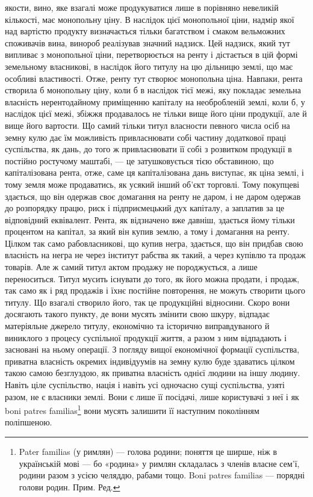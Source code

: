 \parcont{}  %
якости, вино, яке взагалі може продукуватися лише в порівняно невеликій кількості,
має монопольну ціну. В наслідок цієї монопольної ціни, надмір якої над вартістю
продукту визначається тільки багатством і смаком вельможних споживачів вина,
винороб реалізував значний надзиск. Цей надзиск, який тут випливає з монопольної
ціни, перетворюється на ренту і дістається в цій формі земельному власникові, в
наслідок його титулу на цю дільницю землі, що має особливі властивості. Отже,
ренту тут створює монопольна ціна. Навпаки, рента створила б монопольну ціну,
коли б в наслідок тієї межі, яку покладає земельна власність нерентодайному приміщенню
капіталу на необробленій землі, коли б, у наслідок цієї межі, збіжжя продавалось
не тільки вище його ціни продукції, але й вище його вартости. Що самий
тільки титул власности певного числа осіб на земну кулю дає їм можливість привласнювати
собі частину додаткової праці суспільства, як дань, до того ж привласнювати
її собі з розвитком продукції в постійно ростучому маштабі, — це затушковується
тією обставиною, що капіталізована рента, отже, саме ця капіталізована
дань виступає, як ціна землі, і тому земля може продаватись, як усякий інший
об’єкт торговлі. Тому покупцеві здається, що він одержав своє домагання на ренту
не даром, і не даром одержав до розпорядку працю, риск і підприємецький дух
капіталу, а заплатив за це відповідний еквівалент. Рента, як відзначено вже
давніш, здається йому тільки процентом на капітал, за який він купив землю,
а тому і домагання на ренту. Цілком так само рабовласникові, що купив негра,
здається, що він придбав свою власність на негра не через інститут рабства
як такий, а через купівлю та продаж товарів. Але ж самий титул актом продажу
не породжується, а лише переноситься. Титул мусить існувати до того,
як його можна продати, і продаж, так само як і ряд продажів і їхнє постійне
повторення, не можуть створити цього титулу. Що взагалі створило його, так
це продукційні відносини. Скоро вони досягають такого пункту, де вони мусять
змінити свою шкуру, відпадає матеріяльне джерело титулу, економічно
та історично виправдуваного й виниклого з процесу суспільної продукції
життя, а разом з ним відпадають і засновані на ньому операції. З погляду
вищої економічної формації суспільства, приватна власність окремих індивідуумів
на земну кулю буде здаватись цілком такою самою безглуздою, як приватна
власність однієї людини на іншу людину. Навіть ціле суспільство, нація
і навіть усі одночасно сущі суспільства, узяті разом, не є власники землі. Вони є
лише її посідачі, лише користувачі з неї і як boni patres familias\footnote*{
Pater familias (у римлян) — голова родини; поняття це ширше, ніж в українській мові — бо
«родина» у римлян складалась з членів власне сем’ї, родини разом з усією челяддю, рабами тощо. Boni
patres familias — порядні голови родин. Прим. Ред.
} вони мусять
залишити її наступним поколінням поліпшеною.

